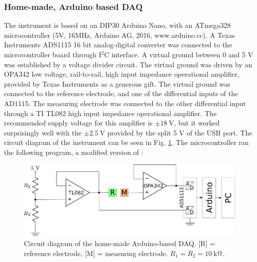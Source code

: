\subsubsection{Home-made, Arduino based DAQ}

The instrument is based on an DIP30 Arduino Nano, with an ATmega328 microcontroller (5V, 16MHz, Arduino AG, 2016, www.arduino.cc). A Texas Instruments ADS1115 16 bit analog-digital converter was connected to the microcontroller board through I$^2$C interface. A virtual ground between 0 and 5 V was established by a voltage divider circuit. The virtual ground was driven by an OPA342 low voltage, rail-to-rail, high input impedance operational amplifier, provided by Texas Instruments as a generous gift. The virtual ground was connected to the reference electrode, and one of the differential inputs of the AD1115. The measuring electrode was connected to the other differential input through a TI TL082 high input impedance operational amplifier. The recommended supply voltage for this amplifier is $\pm 18~$V, but it worked surprisingly well with the $\pm 2.5~$V provided by the split 5 V of the USB port. The circuit diagram of the instrument can be seen in Fig. \ref{fig:daq_circuit}. The microcontroller ran the following program, a modified version of \cite{ads}: 

\begin{figure}
\centering
% 
%
%
\includegraphics[width=1\textwidth]{img/arduino.eps}
\caption[Circuit diagram of the home-made Arduino-based DAQ.]{Circuit diagram of the home-made Arduino-based DAQ. [R] = reference electrode, [M] = measuring electrode. $R_1 = R_2 = 10~$k$\ohm$.}
\label{fig:daq_circuit}
\end{figure}

